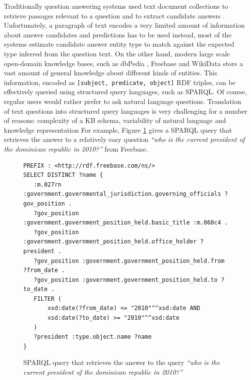 Traditionally question answering systems used text document collections to retrieve passages relevant to a question and to extract candidate answers \cite{Vrandecic:2014:WFC:2661061.2629489}.
Unfortunately, a paragraph of text encodes a very limited amount of information about answer candidates and predictions has to be used instead, \eg most of the systems estimate candidate answer entity type to match against the expected type inferred from the question text.
On the other hand, modern large scale open-domain knowledge bases, such as dbPedia \cite{auer2007dbpedia}, Freebase \cite{Bollacker:2008:FCC:1376616.1376746} and WikiData \cite{Vrandecic:2014:WFC:2661061.2629489} store a vast amount of general knowledge about different kinds of entities.
This information, encoded as \texttt{[subject, predicate, object]} RDF triples, can be effectively queried using structured query languages, such as SPARQL.
Of course, regular users would rather prefer to ask natural language questions.
Translation of text questions into structured query languages is very challenging for a number of reasons: complexity of a KB schema, variability of natural language and knowledge representation \etc
For example, Figure \ref{fig:example_sparql} gives a SPARQL query that retrieves the answer to a relatively easy question \textit{``who is the current president of the dominican republic in 2010?''} from Freebase.

\begin{figure}
\centering
\begin{lstlisting}[frame=single]
PREFIX : <http://rdf.freebase.com/ns/>
SELECT DISTINCT ?name {
   :m.027rn :government.governmental_jurisdiction.governing_officials ?gov_position .
   ?gov_position :government.government_position_held.basic_title :m.060c4 .
   ?gov_position :government.government_position_held.office_holder ?president .
   ?gov_position :government.government_position_held.from ?from_date .
   ?gov_position :government.government_position_held.to ?to_date .
   FILTER (
       xsd:date(?from_date) <= "2010"^^xsd:date AND
       xsd:date(?to_date) >= "2010"^^xsd:date
   )
   ?president :type.object.name ?name
}
\end{lstlisting}
\caption{SPARQL query that retrieves the answer to the query \textit{``who is the current president of the dominican republic in 2010?''}}
\label{fig:example_sparql}
\end{figure}

